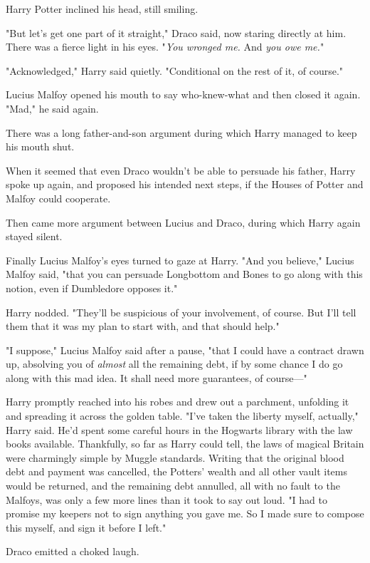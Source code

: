 Harry Potter inclined his head, still smiling.

"But let's get one part of it straight," Draco said, now staring directly at
him. There was a fierce light in his eyes. "\emph{You wronged me.} And
\emph{you owe me.}"

"Acknowledged," Harry said quietly. "Conditional on the rest of it, of course."

Lucius Malfoy opened his mouth to say who-knew-what and then closed it again.
"Mad," he said again.

There was a long father-and-son argument during which Harry managed to keep his
mouth shut.

When it seemed that even Draco wouldn't be able to persuade his father, Harry
spoke up again, and proposed his intended next steps, if the Houses of Potter
and Malfoy could cooperate.

Then came more argument between Lucius and Draco, during which Harry again
stayed silent.

Finally Lucius Malfoy's eyes turned to gaze at Harry. "And you believe," Lucius
Malfoy said, "that you can persuade Longbottom and Bones to go along with this
notion, even if Dumbledore opposes it."

Harry nodded. "They'll be suspicious of your involvement, of course. But I'll
tell them that it was my plan to start with, and that should help."

"I suppose," Lucius Malfoy said after a pause, "that I could have a contract
drawn up, absolving you of \emph{almost} all the remaining debt, if by some
chance I do go along with this mad idea. It shall need more guarantees, of
course—"

Harry promptly reached into his robes and drew out a parchment, unfolding it
and spreading it across the golden table. "I've taken the liberty myself,
actually," Harry said. He'd spent some careful hours in the Hogwarts library
with the law books available. Thankfully, so far as Harry could tell, the laws
of magical Britain were charmingly simple by Muggle standards. Writing that the
original blood debt and payment was cancelled, the Potters' wealth and all
other vault items would be returned, and the remaining debt annulled, all with
no fault to the Malfoys, was only a few more lines than it took to say out
loud. "I had to promise my keepers not to sign anything you gave me. So I made
sure to compose this myself, and sign it before I left."

Draco emitted a choked laugh.

